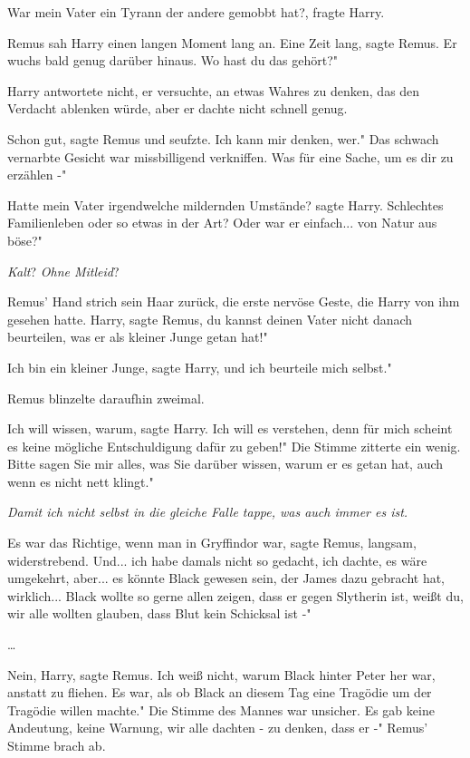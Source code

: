 \glqq War mein Vater ein Tyrann der andere gemobbt hat?\grqq{}, fragte Harry.

Remus sah Harry einen langen Moment lang an. \glqq Eine Zeit lang\grqq{}, sagte
Remus. \glqq Er wuchs bald genug darüber hinaus. Wo hast du das gehört?"

Harry antwortete nicht, er versuchte, an etwas Wahres zu denken, das den
Verdacht ablenken würde, aber er dachte nicht schnell genug.

\glqq Schon gut\grqq{}, sagte Remus und seufzte. \glqq Ich kann mir denken,
wer." Das schwach vernarbte Gesicht war missbilligend verkniffen. \glqq Was für
eine Sache, um es dir zu erzählen -"

\glqq Hatte mein Vater irgendwelche mildernden Umstände?\grqq{} sagte Harry.
\glqq Schlechtes Familienleben oder so etwas in der Art? Oder war er einfach...
von Natur aus böse?"

\emph{Kalt}? \emph{Ohne Mitleid}?

Remus' Hand strich sein Haar zurück, die erste nervöse Geste, die Harry von ihm
gesehen hatte. \glqq Harry\grqq{}, sagte Remus, \glqq du kannst deinen Vater
nicht danach beurteilen, was er als kleiner Junge getan hat!"

\glqq Ich bin ein kleiner Junge\grqq{}, sagte Harry, \glqq und ich beurteile
mich selbst."

Remus blinzelte daraufhin zweimal.

\glqq Ich will wissen, warum\grqq{}, sagte Harry. \glqq Ich will es verstehen,
denn für mich scheint es keine mögliche Entschuldigung dafür zu geben!" Die
Stimme zitterte ein wenig. \glqq Bitte sagen Sie mir alles, was Sie darüber
wissen, warum er es getan hat, auch wenn es nicht nett klingt."

\emph{ Damit ich nicht selbst in die gleiche Falle tappe, was auch immer es ist.}

\glqq Es war das Richtige, wenn man in Gryffindor war\grqq{}, sagte Remus,
langsam, widerstrebend. \glqq Und... ich habe damals nicht so gedacht, ich
dachte, es wäre umgekehrt, aber... es könnte Black gewesen sein, der James dazu
gebracht hat, wirklich... Black wollte so gerne allen zeigen, dass er gegen
Slytherin ist, weißt du, wir alle wollten glauben, dass Blut kein Schicksal ist
-"

…

\glqq Nein, Harry\grqq{}, sagte Remus. \glqq Ich weiß nicht, warum Black hinter
Peter her war, anstatt zu fliehen. Es war, als ob Black an diesem Tag eine
Tragödie um der Tragödie willen machte." Die Stimme des Mannes war unsicher.
\glqq Es gab keine Andeutung, keine Warnung, wir alle dachten - zu denken, dass
er -" Remus' Stimme brach ab.

